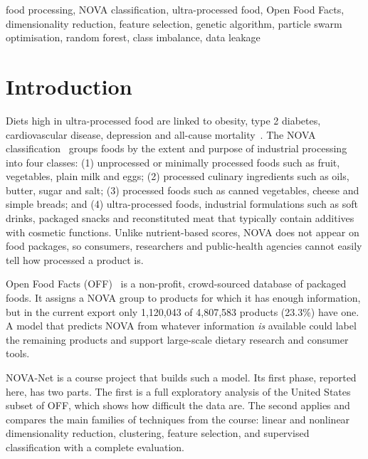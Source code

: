 \documentclass[conference]{IEEEtran}
\begin{document}
\begin{IEEEkeywords}
food processing, NOVA classification, ultra-processed food, Open Food Facts, dimensionality reduction, feature selection, genetic algorithm, particle swarm optimisation, random forest, class imbalance, data leakage
\end{IEEEkeywords}

\section{Introduction}

Diets high in ultra-processed food are linked to obesity, type 2 diabetes, cardiovascular disease, depression and all-cause mortality~\cite{lane2024bmj}. The NOVA classification~\cite{monteiro2019nova} groups foods by the extent and purpose of industrial processing into four classes: (1) unprocessed or minimally processed foods such as fruit, vegetables, plain milk and eggs; (2) processed culinary ingredients such as oils, butter, sugar and salt; (3) processed foods such as canned vegetables, cheese and simple breads; and (4) ultra-processed foods, industrial formulations such as soft drinks, packaged snacks and reconstituted meat that typically contain additives with cosmetic functions. Unlike nutrient-based scores, NOVA does not appear on food packages, so consumers, researchers and public-health agencies cannot easily tell how processed a product is.

Open Food Facts (OFF)~\cite{off} is a non-profit, crowd-sourced database of packaged foods. It assigns a NOVA group to products for which it has enough information, but in the current export only 1,120,043 of 4,807,583 products (23.3\%) have one. A model that predicts NOVA from whatever information \emph{is} available could label the remaining products and support large-scale dietary research and consumer tools.

NOVA-Net is a course project that builds such a model. Its first phase, reported here, has two parts. The first is a full exploratory analysis of the United States subset of OFF, which shows how difficult the data are. The second applies and compares the main families of techniques from the course: linear and nonlinear dimensionality reduction, clustering, feature selection, and supervised classification with a complete evaluation.
\end{document}

